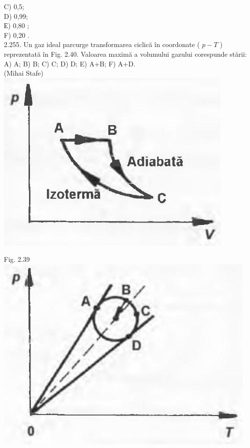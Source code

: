 \documentclass[10pt]{article}
\begin{document}
C) 0,5;\\
D) 0,99;\\
Е) 0,80 ;\\
F) 0,20 .\\
2.255. Un gaz ideal parcurge transformarea ciclică în coordonate ( $p-T$ ) reprezentată în Fig. 2.40. Valoarea maximă a volumului gazului corespunde stării:\\
A) A; B) B; C) C; D) D; E) A+B; F) A+D.\\
(Mihai Stafe)\\
\includegraphics[max width=\textwidth, center]{2025_07_01_5b3ff9fa0d508c8e9f17g-131(1)}

Fig. 2.39\\
\includegraphics[max width=\textwidth, center]{2025_07_01_5b3ff9fa0d508c8e9f17g-131}
\end{document}
